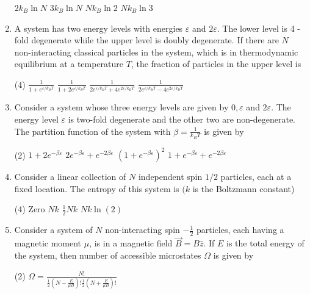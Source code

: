 \begin{enumerate}
\begin{tasks}
		\task[\textbf{A.}] $2 k_{B} \ln N$
		\task[\textbf{B.}] $3 k_{B} \ln N$
		\task[\textbf{C.}] $N k_{B} \ln 2$
		\task[\textbf{D.}] $N k_{B} \ln 3$
	\end{tasks}	
	\item A system has two energy levels with energies $\varepsilon$ and $2 \varepsilon .$ The lower level is 4 -fold degenerate while the upper level is doubly degenerate. If there are $N$ non-interacting classical particles in the system, which is in thermodynamic equilibrium at a temperature $T$, the fraction of particles in the upper level is
	{}
	\begin{tasks}(4)
		\task[\textbf{A.}] $\frac{1}{1+e^{\varepsilon / k_{B} T}}$
		\task[\textbf{B.}] $\frac{1}{1+2 e^{\varepsilon / k_{B} T}}$
		\task[\textbf{C.}] $\frac{1}{2 e^{\varepsilon / k_{B} T}+4 e^{2 \varepsilon / k_{B} T}}$
		\task[\textbf{D.}] $\frac{1}{2 e^{\varepsilon / k_{B} T}-4 e^{2 \varepsilon / k_{B} T}}$
	\end{tasks}
	\item Consider a system whose three energy levels are given by $0, \varepsilon$ and $2 \varepsilon$. The energy level $\varepsilon$ is two-fold degenerate and the other two are non-degenerate. The partition function of the system with $\beta=\frac{1}{k_{B} T}$ is given by
	{}
	\begin{tasks}(2)
		\task[\textbf{A.}] $1+2 e^{-\beta \varepsilon}$
		\task[\textbf{B.}] $2 e^{-\beta \varepsilon}+e^{-2 \beta \varepsilon}$
		\task[\textbf{C.}] $\left(1+e^{-\beta \varepsilon}\right)^{2}$
		\task[\textbf{D.}] $1+e^{-\beta \varepsilon}+e^{-2 \beta \varepsilon}$
	\end{tasks}
	\item Consider a linear collection of $N$ independent spin $1 / 2$ particles, each at a fixed location. The entropy of this system is $(k$ is the Boltzmann constant)
	{}
	\begin{tasks}(4)
		\task[\textbf{A.}] Zero
		\task[\textbf{B.}]  $N k$
		\task[\textbf{C.}]  $\frac{1}{2} N k$
		\task[\textbf{D.}] $N k \ln (2)$
	\end{tasks}	
	\item Consider a system of $N$ non-interacting spin $-\frac{1}{2}$ particles, each having a magnetic moment $\mu$, is in a magnetic field $\vec{B}=B \hat{z} .$ If $E$ is the total energy of the system, then number of accessible microstates $\Omega$ is given by
	{}
	\begin{tasks}(2)
		\task[\textbf{A.}] $\Omega=\frac{N !}{\frac{1}{2}\left(N-\frac{E}{\mu B}\right) ! \frac{1}{2}\left(N+\frac{E}{\mu B}\right) !}$

\end{tasks}
\end{enumerate}
